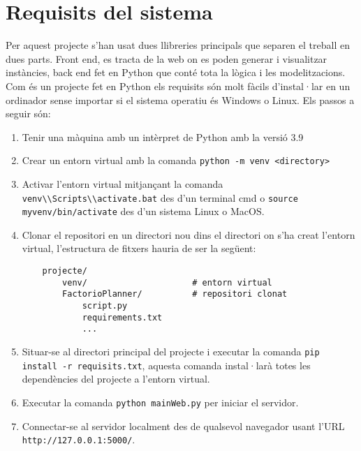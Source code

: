 


\chapter{Requisits del sistema} %

\label{Requisits del sistema} %

Per aquest projecte s'han usat dues llibreries principals que separen el treball en dues parts. Front end, es tracta de la web on es poden generar i visualitzar instàncies, back end fet en Python que conté tota la lògica i les modelitzacions.\\
Com és un projecte fet en Python els requisits són molt fàcils d'instal·lar en un ordinador sense importar si el sistema operatiu és Windows o Linux. Els passos a seguir són:
\begin{enumerate}[label=Pas \arabic*:]
\item Tenir una màquina amb un intèrpret de Python amb la versió 3.9
\item Crear un entorn virtual amb la comanda \lstinline{python -m venv <directory>}
\item Activar l'entorn virtual mitjançant la comanda \lstinline{venv\\Scripts\\activate.bat} des d'un terminal cmd o \lstinline{source myvenv/bin/activate} des d'un sistema Linux o MacOS.
\item Clonar el repositori en un directori nou dins el directori on s'ha creat l'entorn virtual, l'estructura de fitxers hauria de ser la següent: 
    \begin{verbatim}
    projecte/
        venv/                     # entorn virtual
        FactorioPlanner/          # repositori clonat
            script.py
            requirements.txt
            ...
    \end{verbatim}
\item Situar-se al directori principal del projecte i executar la comanda \lstinline{pip install -r requisits.txt}, aquesta comanda instal·larà totes les dependències del projecte a l'entorn virtual.
\item Executar la comanda \lstinline{python mainWeb.py} per iniciar el servidor.
\item Connectar-se al servidor localment des de qualsevol navegador usant l'URL \lstinline{http://127.0.0.1:5000/}.
\end{enumerate}

